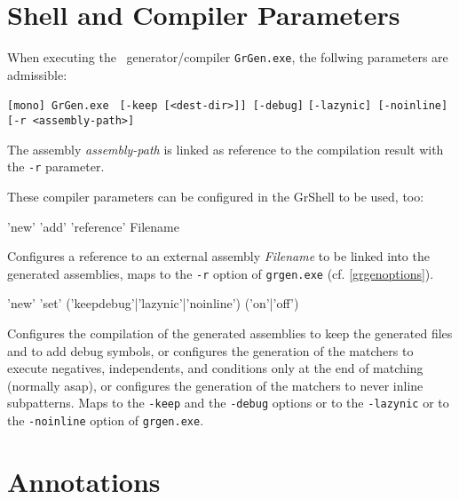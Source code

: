 \section{Shell and Compiler Parameters}

\noindent When executing the \GrG\ generator/compiler \texttt{GrGen.exe}, the follwing parameters are admissible:

\noindent \texttt{[mono] GrGen.exe } \texttt{[-keep [<dest-dir>]] [-debug]} \texttt{[-lazynic] [-noinline]} \texttt{[-r <assembly-path>]}

The assembly \emph{assembly-path} is linked as reference to the compilation result with the \texttt{-r} parameter.

These compiler parameters can be configured in the GrShell to be used, too:
\begin{rail}
  'new' 'add' 'reference' Filename
\end{rail}
Configures a reference to an external assembly \emph{Filename} to be linked into the generated assemblies, maps to the \texttt{-r} option of \texttt{grgen.exe} (cf. \ref{grgenoptions}).

\begin{rail}
  'new' 'set' ('keepdebug'|'lazynic'|'noinline') ('on'|'off')
\end{rail}
Configures the compilation of the generated assemblies to keep the generated files and to add debug symbols,
or configures the generation of the matchers to execute negatives, independents, and conditions only at the end of matching (normally asap),
or configures the generation of the matchers to never inline subpatterns.
Maps to the \texttt{-keep} and the \texttt{-debug} options or to the \texttt{-lazynic} or to the \texttt{-noinline} option of \texttt{grgen.exe}.


\section{Annotations}
\label{annotations}

